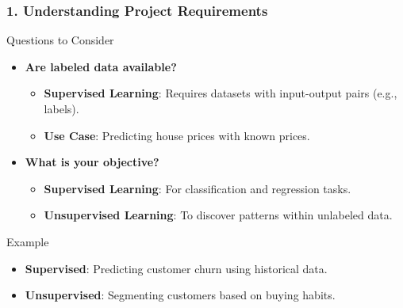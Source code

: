 \documentclass[aspectratio=169]{beamer}
\begin{document}
\begin{frame}[fragile]
    \frametitle{1. Understanding Project Requirements}
    \begin{block}{Questions to Consider}
        \begin{itemize}
            \item \textbf{Are labeled data available?}
                \begin{itemize}
                    \item \textbf{Supervised Learning}: Requires datasets with input-output pairs (e.g., labels).
                    \item \textbf{Use Case}: Predicting house prices with known prices.
                \end{itemize}
            \item \textbf{What is your objective?}
                \begin{itemize}
                    \item \textbf{Supervised Learning}: For classification and regression tasks.
                    \item \textbf{Unsupervised Learning}: To discover patterns within unlabeled data.
                \end{itemize}
        \end{itemize}
    \end{block}

    \begin{block}{Example}
        \begin{itemize}
            \item \textbf{Supervised}: Predicting customer churn using historical data.
            \item \textbf{Unsupervised}: Segmenting customers based on buying habits.
        \end{itemize}
    \end{block}
\end{frame}
\end{document}
